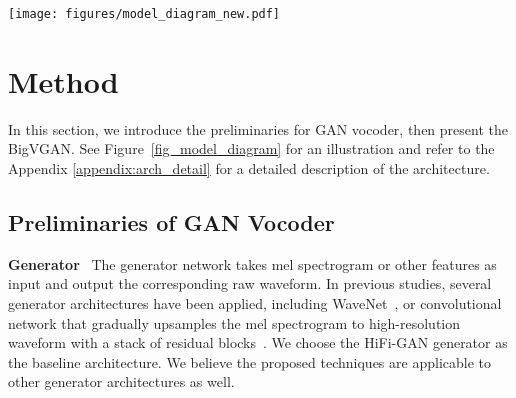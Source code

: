 \documentclass{article} \usepackage{iclr2023_conference,times}
\theoremstyle{plain}
\theoremstyle{definition}
\theoremstyle{remark}
\begin{document}
\begin{figure*}
\centering
\vspace{-.5cm}
\texttt{[image: figures/model\_diagram\_new.pdf]}
\vspace{-.3cm}
\caption{\footnotesize 
Schematic diagram of BigVGAN generator. The generator is composed of multiple blocks of transposed 1-D convolution followed by the proposed \emph{anti-aliased multi-periodicity composition}~(AMP) module. The AMP module adds features from multiple residual blocks with different channel-wise periodicities before dilated 1-D convolutions.
It uses \emph{Snake} function for providing periodic inductive bias, and low-pass filter for anti-aliasing purpose.}
\label{fig_model_diagram}
\end{figure*}



\vspace{-.2cm}
\section{Method}
\label{sec:method}
\vspace{-.1cm}
In this section, we introduce the preliminaries for GAN vocoder, then present the BigVGAN. See Figure~\ref{fig_model_diagram} for an illustration and refer to the Appendix \ref{appendix:arch_detail} for a detailed description of the architecture.
\vspace{-.2cm}
\subsection{Preliminaries of GAN Vocoder}
\vspace{-.2cm}
\label{subsec:gan_vocoder}
\textbf{Generator}~
The generator network takes mel spectrogram or other features as input and output the corresponding raw waveform. 
In previous studies, several generator architectures have been applied, including WaveNet~\citep[e.g.,][]{yamamoto2020parallel}, or convolutional network that gradually upsamples the mel spectrogram to high-resolution waveform with a stack of residual blocks~\citep[e.g.,][]{kumar2019melgan, kong2020hifi}.
We choose the HiFi-GAN generator as the baseline architecture. We believe the proposed techniques are applicable to other generator architectures as well.
\end{document}

